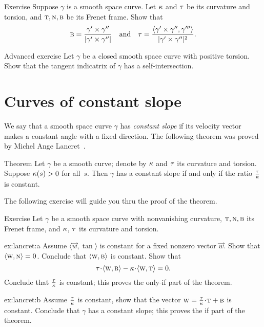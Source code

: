 \begin{thm}{Exercise}\label{ex:frenet}
Suppose $\gamma$ is a smooth space curve.
Let $\kappa$ and $\tau$ be its curvature and torsion,
and $\text{\sc{t}},\text{\sc{n}},\text{\sc{b}}$ be its Frenet frame.
Show that 
\[\text{\sc{b}}=\frac{\gamma'\times\gamma''}{|\gamma'\times\gamma''|}
\quad\text{and}\quad
\tau=\frac{\langle\gamma'\times\gamma'',\gamma'''\rangle}{|\gamma'\times\gamma''|^2}.
\]

\end{thm}

\begin{thm}{Advanced exercise}\label{ex:torsion-indicatrix}
Let $\gamma$ be a closed smooth space curve with positive torsion.
Show that the tangent indicatrix of $\gamma$ has a self-intersection.
\end{thm}


\section{Curves of constant slope}

We say that a smooth space curve $\gamma$ has \emph{constant slope} if its velocity vector makes a constant angle with a fixed direction.
The following theorem was proved by Michel Ange Lancret~\cite{lancret}.

\begin{thm}{Theorem}\label{thm:const-slope}
Let $\gamma$ be a smooth curve;
denote by $\kappa$ and $\tau$ its curvature and torsion.
Suppose $\kappa(s)>0$ for all~$s$.
Then $\gamma$ has a constant slope if and only if the ratio $\tfrac{\tau}{\kappa}$ is constant.
\end{thm}

The following exercise will guide you thru the proof of the theorem. 

\begin{thm}{Exercise}\label{ex:lancret}
Let $\gamma$ be a smooth space curve with nonvanishing curvature, $\text{\sc{t}},\text{\sc{n}},\text{\sc{b}}$ 
its Frenet frame, and $\kappa$, $\tau$ its curvature and torsion.


\begin{subthm}{ex:lancret:a}
Assume $\langle \vec w,\tan\rangle$ is constant for a fixed nonzero vector $\vec w$.
Show that $\langle \text{\sc{w}}, \text{\sc{n}}\rangle =0$.
Conclude that $\langle \text{\sc{w}},\text{\sc{b}}\rangle$ is constant.
Show that \[\tor\cdot\langle \vec w,\bi\rangle -\kur\cdot\langle \vec w,\tan\rangle =0.\]
Conclude that $\tfrac{\tau}{\kappa}$ is constant;
this proves the only-if part of the theorem.
\end{subthm}

\begin{subthm}{ex:lancret:b} Assume $\tfrac{\tau}{\kappa}$ is constant, show that the vector $\vec w=\tfrac\tor\kur\cdot \tan+\bi$ is constant.
Conclude that $\gamma$ has a constant slope; this proves the if part of the theorem.
\end{subthm}

\end{thm}

